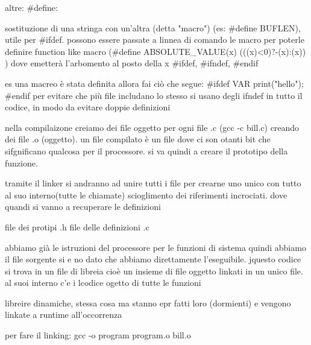 altre:
#define:

sostituzione di una stringa con un'altra (detta "macro") (es: #define BUFLEN), utile per #ifdef. possono essere passate a linnea di comando le macro per poterle definire
function like macro (#define ABSOLUTE_VALUE(x) (((x)<0)?-(x):(x)) ) dove emetterà l'arbomento al posto della x
#ifdef, #ifndef, #endif

es una macreo è stata definita allora fai ciò che segue:
#ifdef VAR
print("hello");
#endif
per evitare che più file includano lo stesso si usano degli ifndef in tutto il codice, in modo da evitare doppie definizioni

nella compilaizone creiamo dei file oggetto per ogni file .c (gcc -c bill.c) creando dei file .o (oggetto). un file compilato è un file dove ci son otanti bit che sifgnificano qualcosa per il processore. si va quindi a creare il prototipo della funzione.

tramite il linker si andranno ad unire tutti i file per crearne uno unico con tutto al suo interno(tutte le chiamate) scioglimento dei riferimenti incrociati. dove quandi si vanno a recuperare le definizioni

file dei protipi .h
file delle definizioni .c

abbiamo già le istruzioni del processore per le funzioni di sistema quindi abbiamo il file sorgente si e no dato che abbiamo direttamente l'eseguibile. jquesto codice si trova in un file di libreia cioè un insieme di file oggetto linkati in un unico file. al suoi interno c'e i lcodice ogetto di tutte le funzioni

libreire dinamiche, stessa cosa ma stanno epr fatti loro (dormienti) e vengono linkate a runtime all'occorrenza

per fare il linking:
gcc -o program program.o bill.o